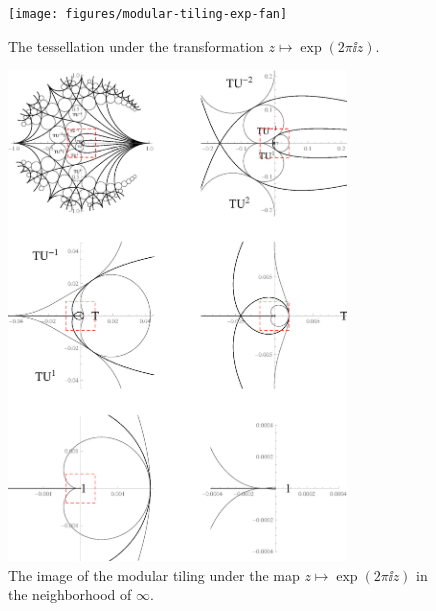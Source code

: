 \begin{figure}
\centering
\texttt{[image: figures/modular-tiling-exp-fan]}
\caption{The tessellation under the transformation $z \mapsto \exp(2 \pi \ii z)$.}
\label{fig_ModularTilingExpFan}
\end{figure}

\begin{figure}
\centering
\includegraphics[width=0.8\textwidth]{figures/modular-tiling-exp-zoom}
\caption{The image of the modular tiling under the map $z \mapsto \exp(2 \pi \ii z)$ in the neighborhood of $\infty$.}
\label{fig_ModularTilingExpZoom}
\end{figure}
